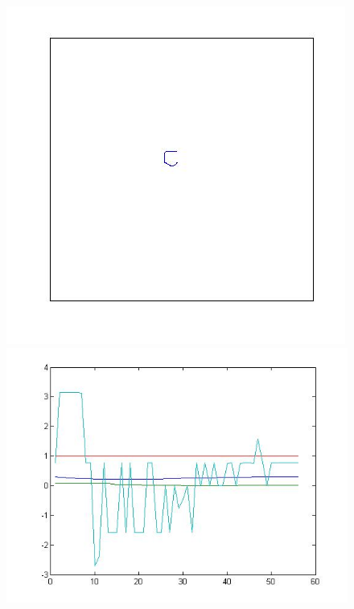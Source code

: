 \begin{figure}[H]
	\centering
	\begin{minipage}{.5\textwidth}
		\centering
		\includegraphics[width=.99\linewidth]{images/cVerySmall}
	\end{minipage}%
	\begin{minipage}{.5\textwidth}
		\centering
		\includegraphics[width=.99\linewidth]{images/cVerySmallPlot}
	\end{minipage}
\end{figure}


